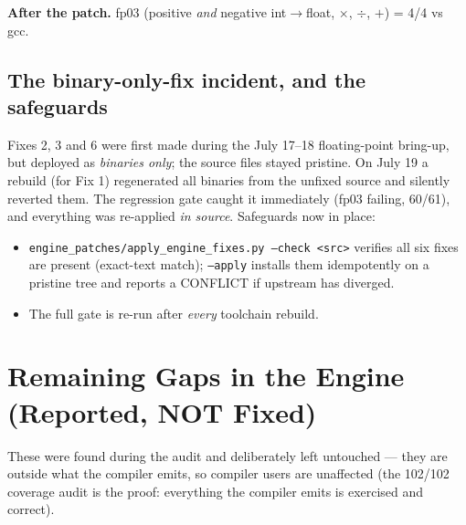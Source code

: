 \documentclass[11pt,a4paper]{report}
\begin{document}
\textbf{After the patch.} fp03 (positive \emph{and} negative int$\to$float,
$\times$, $\div$, $+$) = 4/4 vs gcc.

\section{The binary-only-fix incident, and the safeguards}
\label{sec:incident}

Fixes 2, 3 and 6 were first made during the July 17--18 floating-point
bring-up, but deployed as \emph{binaries only}; the source files stayed
pristine. On July 19 a rebuild (for Fix 1) regenerated all binaries from
the unfixed source and silently reverted them. The regression gate caught
it immediately (fp03 failing, 60/61), and everything was re-applied
\emph{in source}. Safeguards now in place:

\begin{itemize}[itemsep=2pt]
  \item \texttt{engine\_patches/apply\_engine\_fixes.py --check <src>}
        verifies all six fixes are present (exact-text match); \texttt{--apply}
        installs them idempotently on a pristine tree and reports a CONFLICT
        if upstream has diverged.
  \item The full gate is re-run after \emph{every} toolchain rebuild.
\end{itemize}

\chapter{Remaining Gaps in the Engine (Reported, NOT Fixed)}

These were found during the audit and deliberately left untouched ---
they are outside what the compiler emits, so compiler users are unaffected
(the 102/102 coverage audit is the proof: everything the compiler emits is
exercised and correct).
\end{document}

